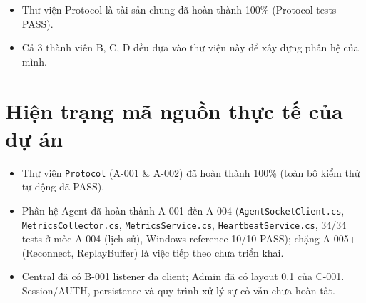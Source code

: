\documentclass[12pt,a4paper]{article}
\begin{document}
\begin{takeawaybox}
\begin{itemize}[leftmargin=1.5em, itemsep=1pt]
  \item Thư viện Protocol là tài sản chung đã hoàn thành 100\% (Protocol tests PASS).
  \item Cả 3 thành viên B, C, D đều dựa vào thư viện này để xây dựng phân hệ của mình.
\end{itemize}
\end{takeawaybox}

\section{Hiện trạng mã nguồn thực tế của dự án}

\begin{summarybox}
\begin{itemize}[leftmargin=1.5em, itemsep=1pt]
  \item Thư viện \texttt{Protocol} (A-001 \& A-002) đã hoàn thành 100\% (toàn bộ kiểm thử tự động đã PASS).
  \item Phân hệ Agent đã hoàn thành A-001 đến A-004 (\texttt{AgentSocketClient.cs}, \texttt{MetricsCollector.cs}, \texttt{MetricsService.cs}, \texttt{HeartbeatService.cs}, 34/34 tests ở mốc A-004 (lịch sử), Windows reference 10/10 PASS); chặng A-005+ (Reconnect, ReplayBuffer) là việc tiếp theo chưa triển khai.
  \item Central đã có B-001 listener đa client; Admin đã có layout 0.1 của C-001. Session/AUTH, persistence và quy trình xử lý sự cố vẫn chưa hoàn tất.
\end{itemize}
\end{summarybox}
\end{document}

